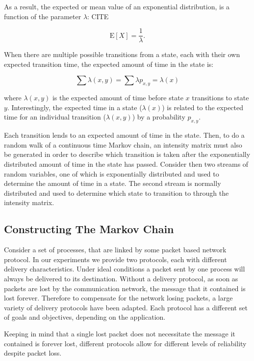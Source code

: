 As a result, the expected or mean value of an exponential distribution, is a function of
the parameter $\lambda$: CITE

\begin{equation}
\mathrm{E}[X] = \frac{1}{\lambda}. \!
\end{equation}

When there are multiple possible transitions from a state, each with their own expected transition time, the expected amount of time in the state is:

\begin{equation}
\sum \lambda(x,y) = \sum \lambda p_{x,y} = \lambda(x)
\end{equation}

where $\lambda(x,y)$ is the expected amount of time before state $x$ transitions to state $y$. Interestingly, the expected time in a state ($\lambda(x)$) is related to the expected time for an individual transition ($\lambda(x,y)$) by a probability $p_{x,y}$.

Each transition lends to an expected amount of time in the state. Then, to do a random walk of a continuous time Markov chain, an intensity matrix must also be generated in order to describe which transition is taken after the exponentially distributed amount of time in the state has passed. Consider then two streams of random variables, one of which is exponentially distributed and used to determine the amount of time in a state. The second stream is normally distributed and used to determine which state to transition to through the intensity matrix.



\subsection{Constructing The Markov Chain}

Consider a set of processes, that are linked by some packet based network protocol. In our experiments we provide two protocols, each with different delivery characteristics. Under ideal conditions a packet sent by one process will always be delivered to its destination. Without a delivery protocol, as soon as packets are lost by the communication network, the message that it contained is lost forever. Therefore to compensate for the network losing packets, a large variety of delivery protocols have been adapted. Each protocol has a different set of goals and objectives, depending on the application.

Keeping in mind that a single lost packet does not necessitate the message it contained is forever lost, different protocols allow for different levels of reliability despite packet loss.

